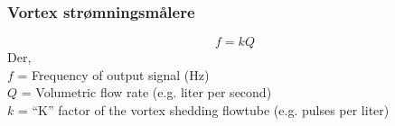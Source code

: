 \documentclass[aspectratio=169,xcolor=dvipsnames]{beamer}
\begin{document}
%
%
%
\begin{frame}
	\frametitle{Vortex strømningsmålere}
$$f = kQ$$
Der,
\\
$f$ = Frequency of output signal (Hz)
\\
$Q$ = Volumetric flow rate (e.g. liter per second)%
\\
$k$ = ``K'' factor of the vortex shedding flowtube (e.g. pulses per liter)

\end{frame}
%
%
%
%
%
%
\end{document}
